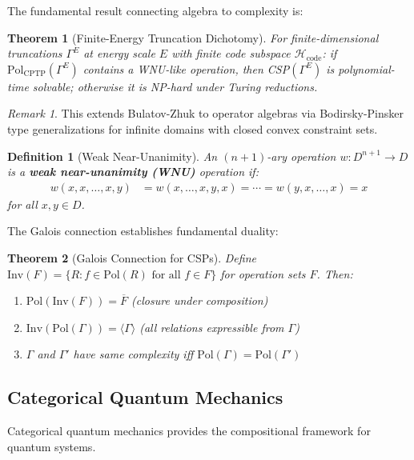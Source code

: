 \documentclass[11pt,a4paper]{article}
\newtheorem{theorem}{Theorem}[section]
\newtheorem{definition}{Definition}[section]
\theoremstyle{remark}
\newtheorem{remark}{Remark}[section]
\theoremstyle{definition}
\begin{document}
The fundamental result connecting algebra to complexity is:

\begin{theorem}[Finite-Energy Truncation Dichotomy]
For finite-dimensional truncations $\Gamma^E$ at energy scale $E$ with finite code subspace $\mathcal{H}_{\text{code}}$:
if $\text{Pol}_{\text{CPTP}}(\Gamma^E)$ contains a WNU-like operation, then CSP$(\Gamma^E)$ is polynomial-time solvable; otherwise it is NP-hard under Turing reductions.
\end{theorem}

\begin{remark}
This extends Bulatov-Zhuk to operator algebras via Bodirsky-Pinsker type generalizations for infinite domains with closed convex constraint sets.
\end{remark}

\begin{definition}[Weak Near-Unanimity]
An $(n+1)$-ary operation $w: D^{n+1} \to D$ is a \textbf{weak near-unanimity (WNU)} operation if:
\begin{align}
w(x, x, \ldots, x, y) &= w(x, \ldots, x, y, x) = \cdots = w(y, x, \ldots, x) = x
\end{align}
for all $x, y \in D$.
\end{definition}

The Galois connection establishes fundamental duality:

\begin{theorem}[Galois Connection for CSPs]
\label{thm:galois}
Define $\text{Inv}(F) = \{R : f \in \text{Pol}(R) \text{ for all } f \in F\}$ for operation sets $F$. Then:
\begin{enumerate}[label=(\roman*)]
\item $\text{Pol}(\text{Inv}(F)) = \overline{F}$ (closure under composition)
\item $\text{Inv}(\text{Pol}(\Gamma)) = \langle \Gamma \rangle$ (all relations expressible from $\Gamma$)
\item $\Gamma$ and $\Gamma'$ have same complexity iff $\text{Pol}(\Gamma) = \text{Pol}(\Gamma')$
\end{enumerate}
\end{theorem}

\subsection{Categorical Quantum Mechanics}

Categorical quantum mechanics provides the compositional framework for quantum systems.
\end{document}
